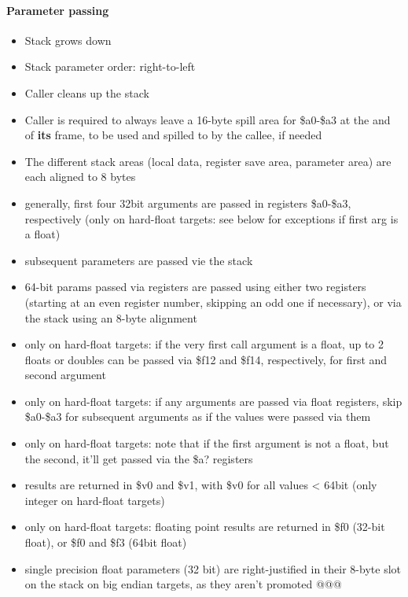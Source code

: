 \paragraph{Parameter passing}

\begin{itemize}
\item Stack grows down
\item Stack parameter order: right-to-left
\item Caller cleans up the stack
\item Caller is required to always leave a 16-byte spill area for \$a0-\$a3 at the and of {\bf its} frame, to be used and spilled to by the callee, if needed
\item The different stack areas (local data, register save area, parameter area) are each aligned to 8 bytes
\item generally, first four 32bit arguments are passed in registers \$a0-\$a3, respectively (only on hard-float targets: see below for exceptions if first arg is a float)
\item subsequent parameters are passed vie the stack
\item 64-bit params passed via registers are passed using either two registers (starting at an even register number, skipping an odd one if necessary), or via the stack using an 8-byte alignment
\item only on hard-float targets: if the very first call argument is a float, up to 2 floats or doubles can be passed via \$f12 and \$f14, respectively, for first and second argument
\item only on hard-float targets: if any arguments are passed via float registers, skip \$a0-\$a3 for subsequent arguments as if the values were passed via them
\item only on hard-float targets: note that if the first argument is not a float, but the second, it'll get passed via the \$a? registers
\item results are returned in \$v0 and \$v1, with \$v0 for all values < 64bit (only integer on hard-float targets)
\item only on hard-float targets: floating point results are returned in \$f0 (32-bit float), or \$f0 and \$f3 (64bit float)
\item single precision float parameters (32 bit) are right-justified in their 8-byte slot on the stack on big endian targets, as they aren't promoted @@@
\end{itemize}

